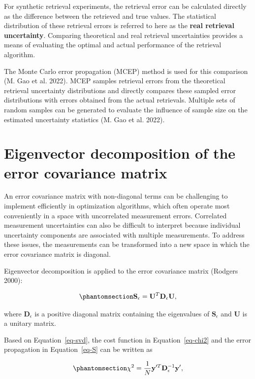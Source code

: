 \documentclass[
  letterpaper,
  open=any]{scrbook}
\begin{document}
For synthetic retrieval experiments, the retrieval error can be
calculated directly as the difference between the retrieved and true
values. The statistical distribution of these retrieval errors is
referred to here as the \textbf{real retrieval uncertainty}. Comparing
theoretical and real retrieval uncertainties provides a means of
evaluating the optimal and actual performance of the retrieval
algorithm.

The Monte Carlo error propagation (MCEP) method is used for this
comparison (M. Gao et al. 2022). MCEP samples retrieval errors from the
theoretical retrieval uncertainty distributions and directly compares
these sampled error distributions with errors obtained from the actual
retrievals. Multiple sets of random samples can be generated to evaluate
the influence of sample size on the estimated uncertainty statistics (M.
Gao et al. 2022).

\section{Eigenvector decomposition of the error covariance
matrix}\label{sec-transform}

An error covariance matrix with non-diagonal terms can be challenging to
implement efficiently in optimization algorithms, which often operate
most conveniently in a space with uncorrelated measurement errors.
Correlated measurement uncertainties can also be difficult to interpret
because individual uncertainty components are associated with multiple
measurements. To address these issues, the measurements can be
transformed into a new space in which the error covariance matrix is
diagonal.

Eigenvector decomposition is applied to the error covariance matrix
(Rodgers 2000):

\begin{equation}\phantomsection\label{eq-svd}{
\mathbf{S}_{\epsilon}
=
\mathbf{U}^{T}
\mathbf{D}_{\epsilon}
\mathbf{U},
}\end{equation}

where \(\mathbf{D}_{\epsilon}\) is a positive diagonal matrix containing
the eigenvalues of \(\mathbf{S}_{\epsilon}\) and \(\mathbf{U}\) is a
unitary matrix.

Based on Equation~\ref{eq-svd}, the cost function in
Equation~\ref{eq-chi2} and the error propagation in Equation~\ref{eq-S}
can be written as

\begin{equation}\phantomsection\label{eq-chi2-new}{
\chi^2
=
\frac{1}{N}
\mathbf{y}'^{T}
\mathbf{D}_{\epsilon}^{-1}
\mathbf{y}',
}\end{equation}
\end{document}
